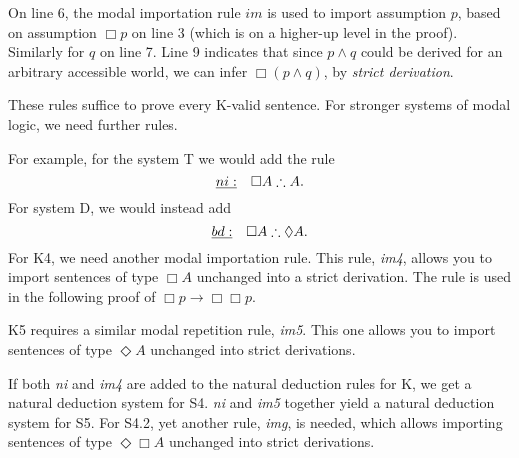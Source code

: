 \documentclass{../wobook2018}
\begin{document}
\noindent%
On line 6, the modal importation rule $im$ is used to import
assumption $p$, based on assumption $\Box p$ on line 3 (which is on a
higher-up level in the proof). Similarly for $q$ on line 7. Line 9
indicates that since $p \land q$ could be derived for an arbitrary
accessible world, we can infer $\Box(p \land q)$, by \emph{strict
  derivation}.

These rules suffice to prove every K-valid sentence. For stronger
systems of modal logic, we need further rules.

For example, for the system T we would add the rule
\[
  \emph{ni:} \quad \Box A \therefore A.
\]
For system D, we would instead add
\[
  \emph{bd:} \quad \Box A \therefore \Diamond A.
\]
For K4, we need another modal importation rule. This rule, \emph{im4},
allows you to import sentences of type $\Box A$ unchanged into a
strict derivation. The rule is used in the following proof of
$\Box p \to \Box \Box p$.

\begin{KMcalc}[]
  \KMclose[]
  \KMclose[]
\end{KMcalc}
%

\noindent
K5 requires a similar modal repetition rule, \emph{im5}. This
one allows you to import sentences of type $\Diamond A$ unchanged into
strict derivations.

If both \emph{ni} and \emph{im4} are added to the natural deduction
rules for K, we get a natural deduction system for S4. \emph{ni} and
\emph{im5} together yield a natural deduction system for S5. For S4.2,
yet another rule, \emph{img}, is needed, which allows importing
sentences of type $\Diamond \Box A$ unchanged into strict derivations.


  
\end{document}
